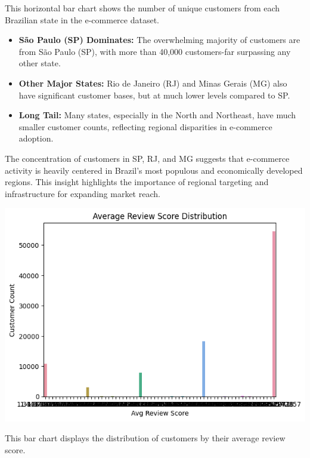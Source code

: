 \documentclass[a4paper]{article}
\begin{document}
\begin{multicols}{2}
    This horizontal bar chart shows the number of unique customers from each Brazilian state in the e-commerce dataset.

    \begin{itemize}
        \item \textbf{São Paulo (SP) Dominates:} The overwhelming majority of customers are from São Paulo (SP), with more than 40,000 customers-far surpassing any other state.
        \item \textbf{Other Major States:} Rio de Janeiro (RJ) and Minas Gerais (MG) also have significant customer bases, but at much lower levels compared to SP.
        \item \textbf{Long Tail:} Many states, especially in the North and Northeast, have much smaller customer counts, reflecting regional disparities in e-commerce adoption.
    \end{itemize}

    The concentration of customers in SP, RJ, and MG suggests that e-commerce activity is heavily centered in Brazil’s most populous and economically developed regions. This insight highlights the importance of regional targeting and infrastructure for expanding market reach.
    \label{fig:customer_state}



\noindent
\begin{minipage}{\columnwidth}
\centering
\includegraphics[width=1\textwidth]{Average Review Score Distribution.png}
\label{fig:Average Review Score Distribution} 
\end{minipage}

This bar chart displays the distribution of customers by their average review score.


\end{multicols}
\end{document}

